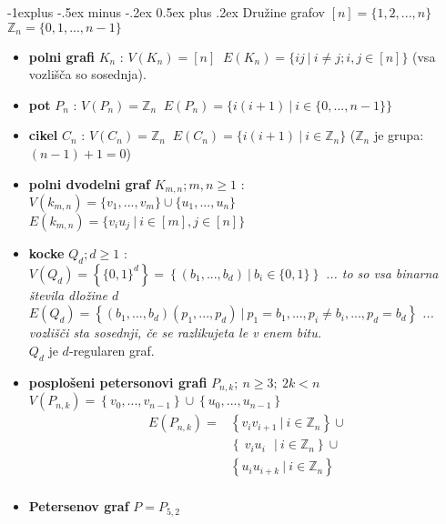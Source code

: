 \documentclass[a4paper,8pt]{extarticle}
\makeatletter
\renewcommand{\subsection}{\@startsection{subsection}{2}{0mm}%
                                {-1explus -.5ex minus -.2ex}%
                                {0.5ex plus .2ex}%
                                {\normalfont\normalsize\bfseries}}
\makeatother
\begin{document}
\begin{multicols}{4}
\subsection{Družine grafov}
$[n] = \{1,2,...,n\}$\\
$\mathbb{Z}_n = \{0,1,...,n-1\}$
\begin{itemize}
    \item \textbf{polni grafi} $K_n$ : $V(K_n) = [n] \ $ $E(K_n) = \{ij\ |\ i \neq j; i,j \in [n]\}$ (vsa vozlišča so sosednja).
    \item \textbf{pot} $P_n$ : $V(P_n) = \mathbb{Z}_n \ $ $E(P_n) = \{ i(i+1)\ |\ i \in \{0, ..., n-1\}\}$
    \item \textbf{cikel} $C_n$ : $V(C_n) = \mathbb{Z}_n \ $ $E(C_n) = \{ i(i+1)\ |\ i \in \mathbb{Z}_n\}$ ($\mathbb{Z}_n$ je grupa: $(n-1)+1 = 0$)
    \item \textbf{polni dvodelni graf} $K_{m,n}; m,n \ge 1$ : \\
    $V(k_{m,n}) = \{v_1, ..., v_m\} \cup \{u_1, ..., u_n\}\ $ \\
    $E(k_{m,n}) = \{v_i u_j\ |\ i\in[m], j\in[n]\}$ \\
    \item \textbf{kocke} $Q_d; d\geq 1$ : \\
    $V(Q_d) = \left\{ \{0,1\}^d \right\} = \left\{ (b_1, ..., b_d)\ |\ b_i \in \{0,1\} \right\}$ \emph{... to so vsa binarna števila dložine $d$} \\
    $E(Q_d) = \left\{ (b_1, ..., b_d)(p_1, ..., p_d)\ |\ p_1 = b_1, ..., p_i \neq b_i, ..., p_d = b_d \right\}$ \emph{... vozlišči sta sosednji, če se razlikujeta le v enem bitu.}\\
    $Q_d$ je $d$-regularen graf.
    \item \textbf{posplošeni petersonovi grafi} $P_{n,k};\ n\geq3;\ 2k<n$\\
    $V(P_{n,k}) = \left\{ v_0, ..., v_{n-1} \right\} \cup \left\{ u_0, ..., u_{n-1} \right\}$\\
    \begin{equation*}
        \begin{aligned}
        E(P_{n,k}) =& \left\{ v_i v_{i+1}\ |\ i\in \mathbb{Z}_n\right\} \cup\\
        & \left\{ \ v_i u_i\ \ \ |\ i\in \mathbb{Z}_n \right\} \cup\\
        & \left\{ u_i u_{i+k}\ |\ i \in \mathbb{Z}_n \right\} \\
        \end{aligned}
    \end{equation*}
    \item \textbf{Petersenov graf} $P = P_{5,2} $
\end{itemize}


\end{multicols}
\end{document}
